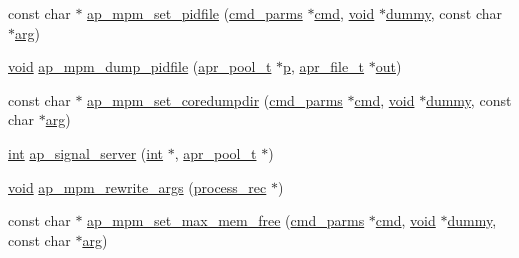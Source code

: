 \begin{DoxyCompactItemize}
const char $\ast$ \hyperlink{group__APACHE__MPM_ga1ce942de41c51ee14978cf8bb1dc9018}{ap\+\_\+mpm\+\_\+set\+\_\+pidfile} (\hyperlink{group__APACHE__CORE__CONFIG_ga1791fbd28d06a9847bad001541c5241e}{cmd\+\_\+parms} $\ast$\hyperlink{group__apr__thread__proc_ga7b715f5a87a71c6766684c1798251237}{cmd}, \hyperlink{group__MOD__ISAPI_gacd6cdbf73df3d9eed42fa493d9b621a6}{void} $\ast$\hyperlink{modules_2cache_2mod__cache__socache_8c_a7c1d654b7b6114d7a0abc8d351dd1bcd}{dummy}, const char $\ast$\hyperlink{group__APACHE__CORE__MUTEX_gaf6517210150d97cd5cb8a17e3768770d}{arg})
\item 
\hyperlink{group__MOD__ISAPI_gacd6cdbf73df3d9eed42fa493d9b621a6}{void} \hyperlink{group__APACHE__MPM_gaabaa6d2b753b46166bb53f151090359f}{ap\+\_\+mpm\+\_\+dump\+\_\+pidfile} (\hyperlink{structapr__pool__t}{apr\+\_\+pool\+\_\+t} $\ast$\hyperlink{group__APACHE__CORE__MPM_ga5cd91701e5c167f2b1a38e70ab57817e}{p}, \hyperlink{structapr__file__t}{apr\+\_\+file\+\_\+t} $\ast$\hyperlink{apr__sha1_8h_acc4166708bf1c388b137e1861496523e}{out})
\item 
const char $\ast$ \hyperlink{group__APACHE__MPM_ga633a66ce3af692e45c7e0d60ab0eeb94}{ap\+\_\+mpm\+\_\+set\+\_\+coredumpdir} (\hyperlink{group__APACHE__CORE__CONFIG_ga1791fbd28d06a9847bad001541c5241e}{cmd\+\_\+parms} $\ast$\hyperlink{group__apr__thread__proc_ga7b715f5a87a71c6766684c1798251237}{cmd}, \hyperlink{group__MOD__ISAPI_gacd6cdbf73df3d9eed42fa493d9b621a6}{void} $\ast$\hyperlink{modules_2cache_2mod__cache__socache_8c_a7c1d654b7b6114d7a0abc8d351dd1bcd}{dummy}, const char $\ast$\hyperlink{group__APACHE__CORE__MUTEX_gaf6517210150d97cd5cb8a17e3768770d}{arg})
\item 
\hyperlink{pcre_8txt_a42dfa4ff673c82d8efe7144098fbc198}{int} \hyperlink{group__APACHE__MPM_ga7d5ef13c9a1669642b422bcac870aac3}{ap\+\_\+signal\+\_\+server} (\hyperlink{pcre_8txt_a42dfa4ff673c82d8efe7144098fbc198}{int} $\ast$, \hyperlink{structapr__pool__t}{apr\+\_\+pool\+\_\+t} $\ast$)
\item 
\hyperlink{group__MOD__ISAPI_gacd6cdbf73df3d9eed42fa493d9b621a6}{void} \hyperlink{group__APACHE__MPM_ga2d02d210669b87ebd911109155b51a1c}{ap\+\_\+mpm\+\_\+rewrite\+\_\+args} (\hyperlink{structprocess__rec}{process\+\_\+rec} $\ast$)
\item 
const char $\ast$ \hyperlink{group__APACHE__MPM_ga9e680e753ab3ba857ab770beb8985738}{ap\+\_\+mpm\+\_\+set\+\_\+max\+\_\+mem\+\_\+free} (\hyperlink{group__APACHE__CORE__CONFIG_ga1791fbd28d06a9847bad001541c5241e}{cmd\+\_\+parms} $\ast$\hyperlink{group__apr__thread__proc_ga7b715f5a87a71c6766684c1798251237}{cmd}, \hyperlink{group__MOD__ISAPI_gacd6cdbf73df3d9eed42fa493d9b621a6}{void} $\ast$\hyperlink{modules_2cache_2mod__cache__socache_8c_a7c1d654b7b6114d7a0abc8d351dd1bcd}{dummy}, const char $\ast$\hyperlink{group__APACHE__CORE__MUTEX_gaf6517210150d97cd5cb8a17e3768770d}{arg})

\end{DoxyCompactItemize}

